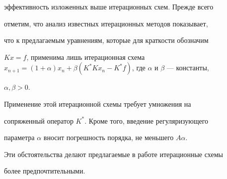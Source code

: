 эффективность изложенных выше итерационных схем. Прежде всего


отметим, что анализ известных итерационных методов показывает,


что к предлагаемым уравнениям, которые для краткости обозначим


$ Kx=f$, применима лишь итерационная схема $ x_{n+1}=(1+\alpha)


x_n +\beta(K^* Kx_n-K^* f)$, где $\alpha $ и $\beta $ --- константы,


$\alpha,\beta>0$.





Применение этой итерационной схемы требует умножения на


сопряженный оператор $ K^* $. Кроме того, введение регуляризующего


параметра $\alpha$ вносит погрешность порядка, не меньшего $A\alpha$.


Эти обстоятельства делают предлагаемые в работе итерационные схемы


более предпочтительными.





